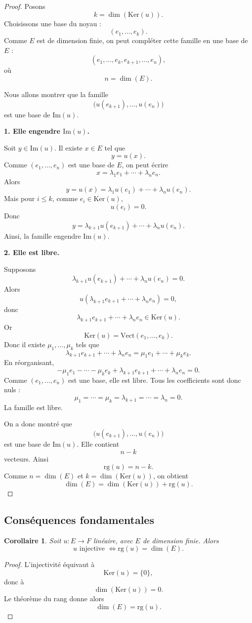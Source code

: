 \documentclass[11pt,a4paper]{article}
\newtheorem{corollaire}[definition]{Corollaire}
\theoremstyle{remark}
\newcommand{\Vect}{\mathrm{Vect}}
\newcommand{\Ker}{\mathrm{Ker}}
\newcommand{\Img}{\mathrm{Im}}
\newcommand{\rg}{\mathrm{rg}}
\begin{document}
\begin{proof}
Posons
\[
k=\dim(\Ker(u)).
\]
Choisissons une base du noyau :
\[
(e_1,\dots,e_k).
\]
Comme \(E\) est de dimension finie, on peut compléter cette famille en une base de \(E\) :
\[
(e_1,\dots,e_k,e_{k+1},\dots,e_n),
\]
où
\[
n=\dim(E).
\]

Nous allons montrer que la famille
\[
\big(u(e_{k+1}),\dots,u(e_n)\big)
\]
est une base de \(\Img(u)\).

\textbf{1. Elle engendre \(\Img(u)\).}

Soit \(y\in \Img(u)\). Il existe \(x\in E\) tel que
\[
y=u(x).
\]
Comme \((e_1,\dots,e_n)\) est une base de \(E\), on peut écrire
\[
x=\lambda_1e_1+\cdots+\lambda_ne_n.
\]
Alors
\[
y=u(x)=\lambda_1u(e_1)+\cdots+\lambda_nu(e_n).
\]
Mais pour \(i\le k\), comme \(e_i\in \Ker(u)\),
\[
u(e_i)=0.
\]
Donc
\[
y=\lambda_{k+1}u(e_{k+1})+\cdots+\lambda_nu(e_n).
\]
Ainsi, la famille engendre \(\Img(u)\).

\textbf{2. Elle est libre.}

Supposons
\[
\lambda_{k+1}u(e_{k+1})+\cdots+\lambda_nu(e_n)=0.
\]
Alors
\[
u(\lambda_{k+1}e_{k+1}+\cdots+\lambda_ne_n)=0,
\]
donc
\[
\lambda_{k+1}e_{k+1}+\cdots+\lambda_ne_n\in \Ker(u).
\]
Or
\[
\Ker(u)=\Vect(e_1,\dots,e_k).
\]
Donc il existe \(\mu_1,\dots,\mu_k\) tels que
\[
\lambda_{k+1}e_{k+1}+\cdots+\lambda_ne_n
=
\mu_1e_1+\cdots+\mu_ke_k.
\]
En réorganisant,
\[
-\mu_1e_1-\cdots-\mu_ke_k+\lambda_{k+1}e_{k+1}+\cdots+\lambda_ne_n=0.
\]
Comme \((e_1,\dots,e_n)\) est une base, elle est libre. Tous les coefficients sont donc nuls :
\[
\mu_1=\cdots=\mu_k=\lambda_{k+1}=\cdots=\lambda_n=0.
\]
La famille est libre.

On a donc montré que
\[
\big(u(e_{k+1}),\dots,u(e_n)\big)
\]
est une base de \(\Img(u)\). Elle contient
\[
n-k
\]
vecteurs. Ainsi
\[
\rg(u)=n-k.
\]
Comme \(n=\dim(E)\) et \(k=\dim(\Ker(u))\), on obtient
\[
\dim(E)=\dim(\Ker(u))+\rg(u).
\]
\end{proof}

\subsection{Conséquences fondamentales}

\begin{corollaire}
Soit \(u:E\to F\) linéaire, avec \(E\) de dimension finie. Alors
\[
u \text{ injective }
\Longleftrightarrow
\rg(u)=\dim(E).
\]
\end{corollaire}

\begin{proof}
L’injectivité équivaut à
\[
\Ker(u)=\{0\},
\]
donc à
\[
\dim(\Ker(u))=0.
\]
Le théorème du rang donne alors
\[
\dim(E)=\rg(u).
\]
\end{proof}
\end{document}
